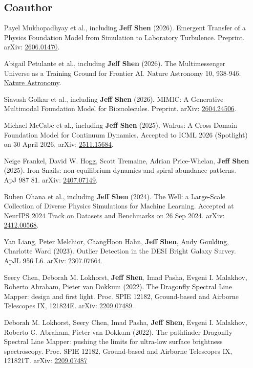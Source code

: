 \documentclass[10pt]{extarticle}
\begin{document}
\subsection*{Coauthor}

\begin{etaremune}
\item Payel Mukhopadhyay et al., including \textbf{Jeff Shen} (2026). Emergent Transfer of a Physics Foundation Model from Simulation to Laboratory Turbulence. Preprint. arXiv: \href{https://arxiv.org/abs/2606.01470}{2606.01470}.
\item Abigail Petulante et al., including \textbf{Jeff Shen} (2026). The Multimessenger Universe as a Training Ground for Frontier AI. Nature Astronomy 10, 938-946. \href{https://rdcu.be/ftdlU}{Nature Astronomy}.
\item Siavash Golkar et al., including \textbf{Jeff Shen} (2026). MIMIC: A Generative Multimodal Foundation Model for Biomolecules. Preprint. arXiv: \href{https://arxiv.org/abs/2604.24506}{2604.24506}.
\item Michael McCabe et al., including \textbf{Jeff Shen} (2025). Walrus: A Cross-Domain Foundation Model for Continuum Dynamics. Accepted to ICML 2026 (Spotlight) on 30 April 2026. arXiv: \href{https://arxiv.org/abs/2511.15684}{2511.15684}.
\item Neige Frankel, David W. Hogg, Scott Tremaine, Adrian Price-Whelan, \textbf{Jeff Shen} (2025). Iron Snails: non-equilibrium dynamics and spiral abundance patterns. ApJ 987 81. arXiv: \href{https://arxiv.org/abs/2407.07149}{2407.07149}.
\item Ruben Ohana et al., including \textbf{Jeff Shen} (2024). The Well: a Large-Scale Collection of Diverse Physics Simulations for Machine Learning. Accepted at NeurIPS 2024 Track on Datasets and Benchmarks on 26 Sep 2024. arXiv: \href{https://arxiv.org/abs/2412.00568}{2412.00568}.
\item Yan Liang, Peter Melchior, ChangHoon Hahn, \textbf{Jeff Shen}, Andy Goulding, Charlotte Ward (2023). Outlier Detection in the DESI Bright Galaxy Survey. ApJL 956 L6. arXiv: \href{https://arxiv.org/abs/2307.07664}{2307.07664}.
\item Seery Chen, Deborah M. Lokhorst, \textbf{Jeff Shen}, Imad Pasha, Evgeni I. Malakhov, Roberto Abraham, Pieter van Dokkum (2022). The Dragonfly Spectral Line Mapper: design and first light. Proc. SPIE 12182, Ground-based and Airborne Telescopes IX, 121824E. arXiv: \href{https://arxiv.org/abs/2209.07489}{2209.07489}.
\item Deborah M. Lokhorst, Seery Chen, Imad Pasha, \textbf{Jeff Shen}, Evgeni I. Malakhov, Roberto G. Abraham, Pieter van Dokkum (2022). The pathfinder Dragonfly Spectral Line Mapper: pushing the limits for ultra-low surface brightness spectroscopy. Proc. SPIE 12182, Ground-based and Airborne Telescopes IX, 121821T. arXiv: \href{https://arxiv.org/abs/2209.07487}{2209.07487}
\end{etaremune}
\end{document}
